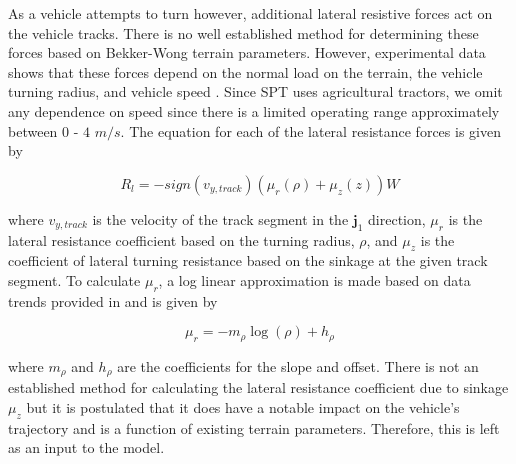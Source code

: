 As a vehicle attempts to turn however, additional lateral resistive forces act on the vehicle tracks. There is no well established method for determining these forces based on Bekker-Wong terrain parameters. However, experimental data shows that these forces depend on the normal load on the terrain, the vehicle turning radius, and vehicle speed \cite{Wong2008}. Since SPT uses agricultural tractors, we omit any dependence on speed since there is a limited operating range approximately between $0$ - $4$ $m/s$. The equation for each of the lateral resistance forces is given by
\begin{linenomath*}
    \begin{equation}
        R_l = -sign(v_{y,track})(\mu_r(\rho) + \mu_z(z))W
    \end{equation}
\end{linenomath*}
where $v_{y,track}$ is the velocity of the track segment in the $\mathbf{j}_1$ direction, $\mu_r$ is the lateral resistance coefficient based on the turning radius, $\rho$, and $\mu_z$  is the coefficient of lateral turning resistance based on the sinkage at the given track segment. To calculate $\mu_r$, a log linear approximation is made based on data trends provided in \cite{Wong2008} and is given by
\begin{linenomath*}
    \begin{equation}
        \mu_r = -m_{\rho}\log(\rho) + h_{\rho}
    \end{equation}
\end{linenomath*}
where $m_\rho$ and $h_\rho$ are the coefficients for the slope and offset. There is not an established method for calculating the lateral resistance coefficient due to sinkage $\mu_z$ but it is postulated that it does have a notable impact on the vehicle's trajectory and is a function of existing terrain parameters. Therefore, this is left as an input to the model. 

